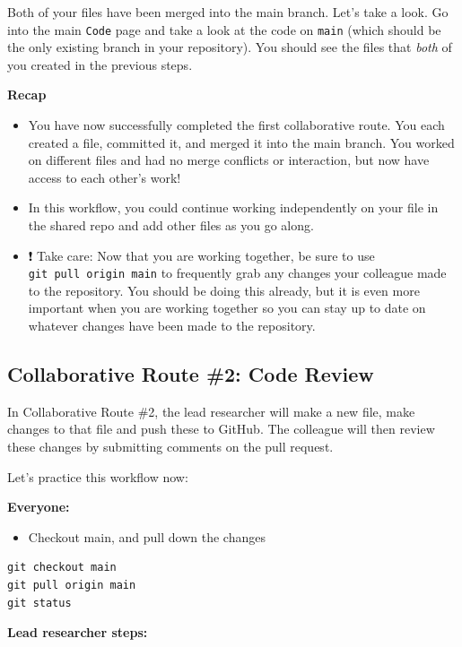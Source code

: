 \documentclass[
]{book}
\providecommand{\tightlist}{%
  \setlength{\itemsep}{0pt}\setlength{\parskip}{0pt}}
\begin{document}
Both of your files have been merged into the main branch. Let's take a look. Go
into the main \texttt{Code} page and take a look at the code on \texttt{main} (which should be
the only existing branch in your repository). You should see the files that
\emph{both} of you created in the previous steps.

\textbf{Recap}

\begin{itemize}
\item
  You have now successfully completed the first collaborative route. You each
  created a file, committed it, and merged it into the main branch. You worked on
  different files and had no merge conflicts or interaction, but now have access
  to each other's work!
\item
  In this workflow, you could continue working independently on your file in
  the shared repo and add other files as you go along.
\item
  ❗ Take care: Now that you are working together, be sure
  to use \texttt{git\ pull\ origin\ main} to frequently grab any changes your colleague made to the
  repository. You should be doing this already, but it is even more important
  when you are working together so you can stay up to date on whatever changes
  have been made to the repository.
\end{itemize}

\subsection{Collaborative Route \#2: Code Review}\label{collaborative-route-2-code-review}

In Collaborative Route \#2, the lead researcher will make a new file, make
changes to that file and push these to GitHub. The colleague will then review
these changes by submitting comments on the pull request.

Let's practice this workflow now:

\textbf{Everyone:}

\begin{itemize}
\tightlist
\item
  Checkout main, and pull down the changes
\end{itemize}

\begin{verbatim}
git checkout main
git pull origin main
git status
\end{verbatim}

\textbf{Lead researcher steps:}
\end{document}
